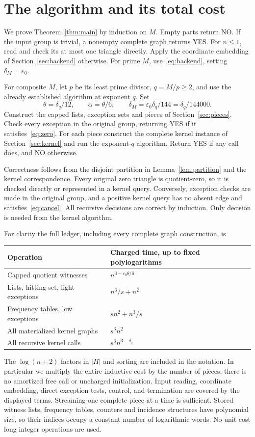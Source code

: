 \documentclass[manuscript,screen,nonacm,11pt]{acmart}
\newcommand{\eps}{\varepsilon_0}
\begin{document}
\section{The algorithm and its total cost}\label{sec:cost}

We prove Theorem~\ref{thm:main} by induction on $M$. Empty parts return NO.
If the input group is trivial, a nonempty complete graph returns YES.
For $n\le1$, read and check its at most one triangle directly. Apply the
coordinate embedding of Section~\ref{sec:backend} otherwise. For prime $M$,
use~\eqref{eq:backend}, setting $\delta_M=\eps$.

For composite $M$, let $p$ be its least prime divisor, $q=M/p\ge2$, and
use the already established algorithm at exponent $q$. Set
\begin{equation}\label{eq:recurrence}
 \theta=\delta_q/12,\qquad \alpha=\theta/6,\qquad
 \delta_M=\eps\delta_q/144=\delta_q/144000.
\end{equation}
Construct the capped lists, exception sets and pieces of
Section~\ref{sec:pieces}. Check every exception in the original group,
returning YES if it satisfies~\eqref{eq:zero}. For each piece construct the
complete kernel instance of Section~\ref{sec:kernel} and run the exponent-$q$
algorithm. Return YES if any call does, and NO otherwise.

Correctness follows from the disjoint partition in Lemma~\ref{lem:partition}
and the kernel correspondence. Every original zero triangle is quotient-zero,
so it is checked directly or represented in a kernel query. Conversely,
exception checks are made in the original group, and a positive kernel query
has no absent edge and satisfies~\eqref{eq:cancel}. All recursive decisions
are correct by induction. Only decision is needed from the kernel algorithm.

For clarity the full ledger, including every complete graph construction, is
\begin{center}
\begin{tabular}{ll}
\toprule
Operation & Charged time, up to fixed polylogarithms\\
\midrule
Capped quotient witnesses & $n^{3-\eps\theta/6}$\\
Lists, hitting set, light exceptions & $n^3/s+n^2$\\
Frequency tables, low exceptions & $sn^2+n^3/s$\\
All materialized kernel graphs & $s^3n^2$\\
All recursive kernel calls & $s^3n^{3-\delta_q}$\\
\bottomrule
\end{tabular}
\end{center}
The $\log(n+2)$ factors in $|H|$ and sorting are included in the notation.
In particular we multiply the entire inductive cost by the number of pieces;
there is no amortized free call or uncharged initialization. Input reading,
coordinate embedding, direct exception tests, control, and termination are
covered by the displayed terms. Streaming one complete piece at a time is
sufficient. Stored witness lists, frequency tables, counters and incidence
structures have polynomial size, so their indices occupy a constant number
of logarithmic words. No unit-cost long integer operations are used.
\end{document}
